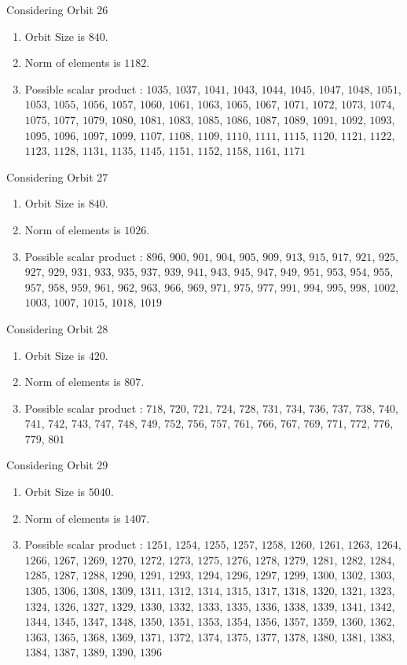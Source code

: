 \documentclass[12pt]{article}
\begin{document}
Considering Orbit 26
\begin{enumerate}
\item Orbit Size is $840$.
\item Norm of elements is $1182$.
\item Possible scalar product : $1035$, $1037$, $1041$, $1043$, $1044$, $1045$, $1047$, $1048$, $1051$, $1053$, $1055$, $1056$, $1057$, $1060$, $1061$, $1063$, $1065$, $1067$, $1071$, $1072$, $1073$, $1074$, $1075$, $1077$, $1079$, $1080$, $1081$, $1083$, $1085$, $1086$, $1087$, $1089$, $1091$, $1092$, $1093$, $1095$, $1096$, $1097$, $1099$, $1107$, $1108$, $1109$, $1110$, $1111$, $1115$, $1120$, $1121$, $1122$, $1123$, $1128$, $1131$, $1135$, $1145$, $1151$, $1152$, $1158$, $1161$, $1171$
\end{enumerate}
Considering Orbit 27
\begin{enumerate}
\item Orbit Size is $840$.
\item Norm of elements is $1026$.
\item Possible scalar product : $896$, $900$, $901$, $904$, $905$, $909$, $913$, $915$, $917$, $921$, $925$, $927$, $929$, $931$, $933$, $935$, $937$, $939$, $941$, $943$, $945$, $947$, $949$, $951$, $953$, $954$, $955$, $957$, $958$, $959$, $961$, $962$, $963$, $966$, $969$, $971$, $975$, $977$, $991$, $994$, $995$, $998$, $1002$, $1003$, $1007$, $1015$, $1018$, $1019$
\end{enumerate}
Considering Orbit 28
\begin{enumerate}
\item Orbit Size is $420$.
\item Norm of elements is $807$.
\item Possible scalar product : $718$, $720$, $721$, $724$, $728$, $731$, $734$, $736$, $737$, $738$, $740$, $741$, $742$, $743$, $747$, $748$, $749$, $752$, $756$, $757$, $761$, $766$, $767$, $769$, $771$, $772$, $776$, $779$, $801$
\end{enumerate}
Considering Orbit 29
\begin{enumerate}
\item Orbit Size is $5040$.
\item Norm of elements is $1407$.
\item Possible scalar product : $1251$, $1254$, $1255$, $1257$, $1258$, $1260$, $1261$, $1263$, $1264$, $1266$, $1267$, $1269$, $1270$, $1272$, $1273$, $1275$, $1276$, $1278$, $1279$, $1281$, $1282$, $1284$, $1285$, $1287$, $1288$, $1290$, $1291$, $1293$, $1294$, $1296$, $1297$, $1299$, $1300$, $1302$, $1303$, $1305$, $1306$, $1308$, $1309$, $1311$, $1312$, $1314$, $1315$, $1317$, $1318$, $1320$, $1321$, $1323$, $1324$, $1326$, $1327$, $1329$, $1330$, $1332$, $1333$, $1335$, $1336$, $1338$, $1339$, $1341$, $1342$, $1344$, $1345$, $1347$, $1348$, $1350$, $1351$, $1353$, $1354$, $1356$, $1357$, $1359$, $1360$, $1362$, $1363$, $1365$, $1368$, $1369$, $1371$, $1372$, $1374$, $1375$, $1377$, $1378$, $1380$, $1381$, $1383$, $1384$, $1387$, $1389$, $1390$, $1396$
\end{enumerate}
\end{document}

